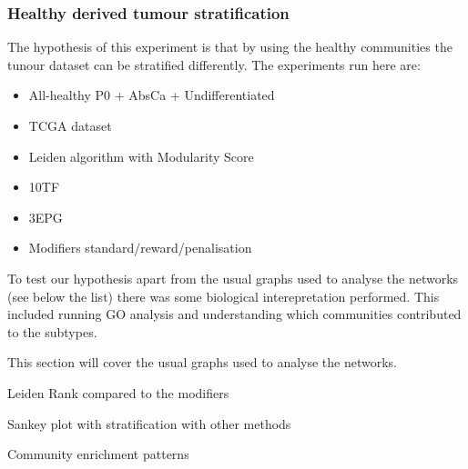 \subsubsection{Healthy derived tumour stratification} \label{Sec:N_I:h_derived}

The hypothesis of this experiment is that by using the healthy communities the tunour dataset can be stratified differently. The experiments run here are:
\begin{itemize}
    \item All-healthy \- P0 + AbsCa + Undifferentiated
    \item TCGA dataset 
    \item Leiden algorithm with Modularity Score
    \item 10TF
    \item 3EPG
    \item Modifiers standard/reward/penalisation
\end{itemize}

To test our hypothesis apart from the usual graphs used to analyse the networks (see below the list) there was some biological interepretation performed. This included running GO analysis and understanding which communities contributed to the subtypes. 

This section will cover the usual graphs used to analyse the networks.
\begin{todolist}
    \item Leiden Rank compared to the modifiers
    \item Sankey plot with stratification with other methods
    \item Community enrichment patterns 
\end{todolist}
